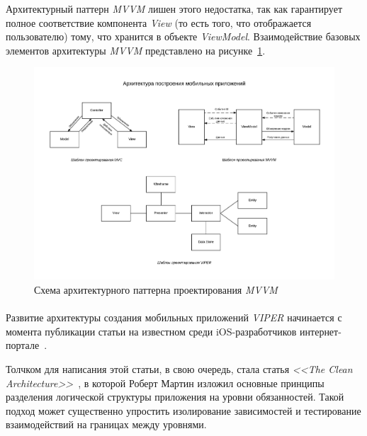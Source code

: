 Архитектурный паттерн \textit{MVVM} лишен этого недостатка, так как гарантирует полное
соответствие компонента \textit{View} (то есть того, что отображается пользователю) тому,
что хранится в объекте \textit{ViewModel}.
Взаимодействие базовых элементов архитектуры \textit{MVVM} представлено на рисунке~\ref{fig:mvvm}.
\begin{figure}[h!]
  \centering
  \includegraphics[width=160mm]{fig/mvvm}
  \caption{Схема архитектурного паттерна проектирования \textit{MVVM}}
  \label{fig:mvvm}
\end{figure}

\pagebreak


\paragraph{}

Развитие архитектуры создания мобильных приложений \textit{VIPER} начинается
с момента публикации статьи на известном среди iOS-разработчиков
интернет-портале~\cite{viper_objc_io}.

Толчком для написания этой статьи, в свою очередь,
стала статья \textit{<<The Clean Architecture>>}~\cite{clean_architecture},
в которой Роберт Мартин изложил основные принципы разделения логической
структуры приложения на уровни обязанностей. Такой подход может
существенно упростить изолирование зависимостей и тестирование взаимодействий
на границах между уровнями.

